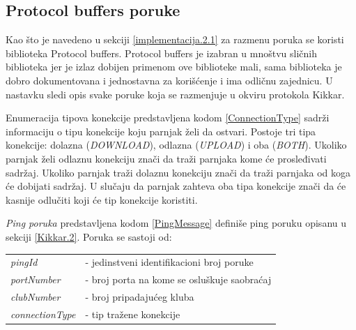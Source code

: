 \documentclass[12pt,oneside]{memoir}
\begin{document}
\subsection{Protocol buffers poruke}
\label{implementacija.2.2}

Kao što je navedeno u sekciji \ref{implementacija.2.1} za razmenu poruka se koristi biblioteka Protocol buffers. Protocol buffers je izabran u mnoštvu sličnih biblioteka jer je izlaz dobijen primenom ove biblioteke mali, sama biblioteka je dobro dokumentovana i jednostavna za korišćenje i ima odličnu zajednicu. U nastavku sledi opis svake poruke koja se razmenjuje u okviru protokola Kikkar.




Enumeracija tipova konekcije predstavljena kodom \ref{ConnectionType} sadrži informaciju o tipu konekcije koju parnjak želi da ostvari. Postoje tri tipa konekcije: dolazna (\textit{DOWNLOAD}), odlazna (\textit{UPLOAD}) i oba (\textit{BOTH}). Ukoliko parnjak želi odlaznu konekciju znači da traži parnjaka kome će prosleđivati sadržaj. Ukoliko parnjak traži dolaznu konekciju znači da traži parnjaka od koga će dobijati sadržaj. U slučaju da parnjak zahteva oba tipa konekcije znači da će kasnije odlučiti koji će tip konekcije koristiti.




\textit{Ping poruka} predstavljena kodom \ref{PingMessage} definiše ping poruku opisanu u sekciji \ref{Kikkar.2}. Poruka se sastoji od:
 
\begin{center}
\begin{tabular}{ p{4cm} p{10cm} }
 \textit{pingId} & - jedinstveni identifikacioni broj poruke \\ 
 \textit{portNumber} & - broj porta na kome se osluškuje saobraćaj \\  
 \textit{clubNumber} & - broj pripadajućeg kluba \\
 \textit{connectionType} & - tip  tražene konekcije \\
\end{tabular}
\end{center}



\end{document}

